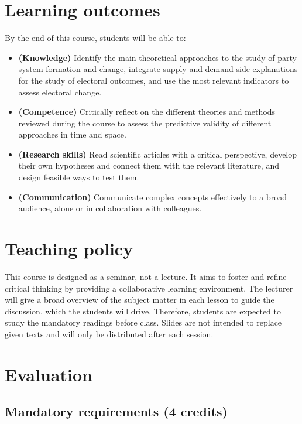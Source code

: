 \documentclass[
  12pt,
]{article}
\begin{document}
\hypertarget{learning-outcomes}{%
\section{Learning outcomes}\label{learning-outcomes}}

By the end of this course, students will be able to:

\begin{itemize}
\item
  \textbf{(Knowledge)} Identify the main theoretical approaches to the
  study of party system formation and change, integrate supply and
  demand-side explanations for the study of electoral outcomes, and use
  the most relevant indicators to assess electoral change.
\item
  \textbf{(Competence)} Critically reflect on the different theories and
  methods reviewed during the course to assess the predictive validity
  of different approaches in time and space.
\item
  \textbf{(Research skills)} Read scientific articles with a critical
  perspective, develop their own hypotheses and connect them with the
  relevant literature, and design feasible ways to test them.
\item
  \textbf{(Communication)} Communicate complex concepts effectively to a
  broad audience, alone or in collaboration with colleagues.
\end{itemize}

\hypertarget{teaching-policy}{%
\section{Teaching policy}\label{teaching-policy}}

This course is designed as a seminar, not a lecture. It aims to foster
and refine critical thinking by providing a collaborative learning
environment. The lecturer will give a broad overview of the subject
matter in each lesson to guide the discussion, which the students will
drive. Therefore, students are expected to study the mandatory readings
before class. Slides are not intended to replace given texts and will
only be distributed after each session.

\hypertarget{evaluation}{%
\section{Evaluation}\label{evaluation}}

\hypertarget{mandatory-requirements-4-credits}{%
\subsection{Mandatory requirements (4
credits)}\label{mandatory-requirements-4-credits}}
\end{document}
